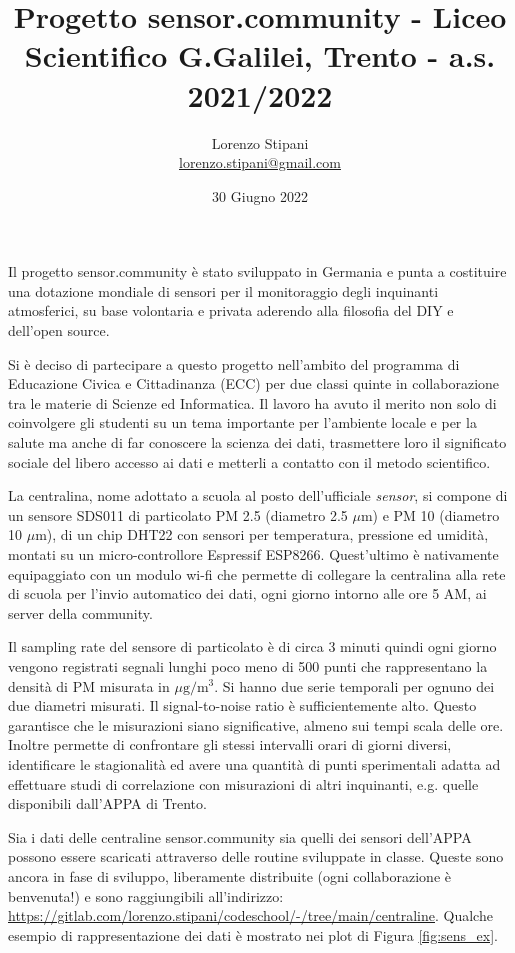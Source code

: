 \documentclass{article}
\title{Progetto sensor.community - Liceo Scientifico G.Galilei, Trento - a.s. 2021/2022}
\date{30 Giugno 2022}
\author{Lorenzo Stipani \\ \small{\url{lorenzo.stipani@gmail.com}}}
\begin{document}
\maketitle

Il progetto sensor.community è stato sviluppato in Germania e punta a costituire una dotazione mondiale di sensori per il monitoraggio degli inquinanti atmosferici, su base volontaria e privata aderendo alla filosofia del DIY e dell'open source. 

Si è deciso di partecipare a questo progetto nell'ambito del programma di Educazione Civica e Cittadinanza (ECC) per due classi quinte in collaborazione tra le materie di Scienze ed Informatica. Il lavoro ha avuto il merito non solo di coinvolgere gli studenti su un tema importante per l'ambiente locale e per la salute ma anche di far conoscere la scienza dei dati, trasmettere loro il significato sociale del libero accesso ai dati e metterli a contatto con il metodo scientifico.

La centralina, nome adottato a scuola al posto dell'ufficiale \emph{sensor}, si compone di un sensore \textsc{SDS011} di particolato PM 2.5 (diametro 2.5 $\mu$m) e PM 10 (diametro 10 $\mu$m), di un chip \textsc{DHT22} con sensori per temperatura, pressione ed umidità, montati su un micro-controllore Espressif \textsc{ESP8266}. Quest'ultimo è nativamente equipaggiato con un modulo wi-fi che permette di collegare la centralina alla rete di scuola per l'invio automatico dei dati, ogni giorno intorno alle ore 5 AM, ai server della community.

Il sampling rate del sensore di particolato è di circa 3 minuti quindi ogni giorno vengono registrati segnali lunghi poco meno di 500 punti che rappresentano la densità di PM misurata in $\mu\mathrm{g}/\mathrm{m}^3$. Si hanno due serie temporali per ognuno dei due diametri misurati. Il signal-to-noise ratio è sufficientemente alto. Questo garantisce che le misurazioni siano significative, almeno sui tempi scala delle ore. Inoltre permette di confrontare gli stessi intervalli orari di giorni diversi, identificare le stagionalità ed avere una quantità di punti sperimentali adatta ad effettuare studi di correlazione con misurazioni di altri inquinanti, e.g. quelle disponibili dall'APPA di Trento.

Sia i dati delle centraline sensor.community sia quelli dei sensori dell'APPA possono essere scaricati attraverso delle routine sviluppate in classe. Queste sono ancora in fase di sviluppo, liberamente distribuite (ogni collaborazione è benvenuta!) e sono raggiungibili all'indirizzo: \url{https://gitlab.com/lorenzo.stipani/codeschool/-/tree/main/centraline}. Qualche esempio di rappresentazione dei dati è mostrato nei plot di Figura \ref{fig:sens_ex}.
\end{document}
